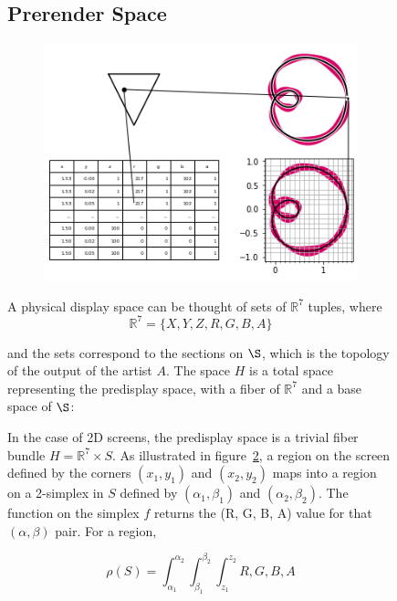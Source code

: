 \documentclass[../main.tex]{subfiles}
\begin{document}
\begin{figure}
\subsection{Prerender Space}
\label{sec:display}

\begin{figure}[h]
    \includegraphics[width=.4\linewidth]{figures/sections/math/render.png}
    \caption{}
    \label{fig:render}
\end{figure}

A physical display space can be thought of sets of $\mathbb{R}^{7}$ tuples, where 
\begin{equation}
    \mathbb{R}^{7} = \{X, Y, Z, R, G, B, A\}
\end{equation}

and the sets correspond to the sections on $\S$, which is the topology of the output of the artist $A$. The space $H$ is a total space representing the predisplay space, with a fiber of $\mathbb{R}^7$ and a base space of $\S$:



In the case of 2D screens, the predisplay space is a trivial fiber bundle $H=\mathbb{R}^{7}\times S$. As illustrated in figure~\ref{fig:render}, a region on the screen defined by the corners $(x_1, y_1)$ and $(x_2, y_2)$ maps into a region on a 2-simplex in $S$ defined by $(\alpha_1, \beta_1)$ and $(\alpha_2, \beta_2)$. The function on the simplex $f$ returns the (R, G, B, A) value for that $(\alpha, \beta)$ pair. For a region, 

\begin{equation*}
\rho(S) = \int_{\alpha_1}^{\alpha_2}\int_{\beta_1}^{\beta_2}\int_{z_1}^{z_2}{R, G, B, A}  
\end{equation*}


\end{figure}
\end{document}

